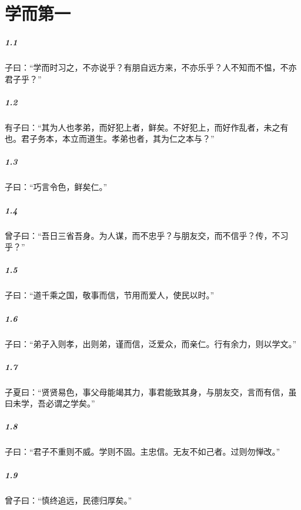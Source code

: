 \documentclass[main.tex]{subfiles}
\begin{document}
\chapter{学而第一}

\paragraph{1.1}
子曰：“学而时习之，不亦说乎？有朋自远方来，不亦乐乎？人不知而不愠，不亦君子乎？”

\paragraph{1.2}
有子曰：“其为人也孝弟，而好犯上者，鲜矣。不好犯上，而好作乱者，未之有也。君子务本，本立而道生。孝弟也者，其为仁之本与？”

\paragraph{1.3}
子曰：“巧言令色，鲜矣仁。”

\paragraph{1.4}
曾子曰：“吾日三省吾身。为人谋，而不忠乎？与朋友交，而不信乎？传，不习乎？”

\paragraph{1.5}
子曰：“道千乘之国，敬事而信，节用而爱人，使民以时。”

\paragraph{1.6}
子曰：“弟子入则孝，出则弟，谨而信，泛爱众，而亲仁。行有余力，则以学文。”

\paragraph{1.7}
子夏曰：“贤贤易色，事父母能竭其力，事君能致其身，与朋友交，言而有信，虽曰未学，吾必谓之学矣。”

\paragraph{1.8}
子曰：“君子不重则不威。学则不固。主忠信。无友不如己者。过则勿惮改。”

\paragraph{1.9}
曾子曰：“慎终追远，民德归厚矣。”
\end{document}
